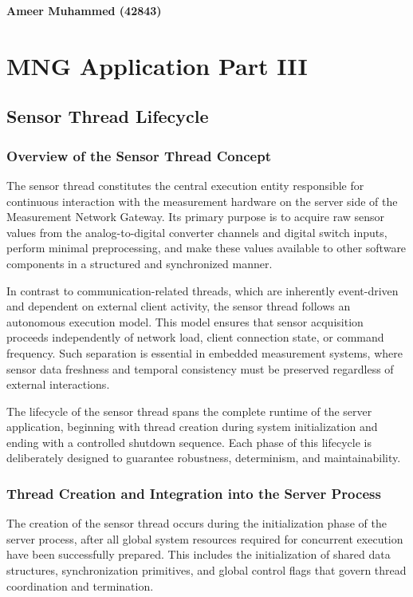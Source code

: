 \newpage
\null 
\vfill
\begin{center}
\textbf{\large Ameer Muhammed (42843)}
\end{center}
\vfill
{}
\clearpage	

\chapter{MNG Application Part III}
\section{Sensor Thread Lifecycle}
\subsection{Overview of the Sensor Thread Concept}
The sensor thread constitutes the central execution entity responsible for continuous interaction with the measurement hardware on the server side of the Measurement Network Gateway. Its primary purpose is to acquire raw sensor values from the analog-to-digital converter channels and digital switch inputs, perform minimal preprocessing, and make these values available to other software components in a structured and synchronized manner.

In contrast to communication-related threads, which are inherently event-driven and dependent on external client activity, the sensor thread follows an autonomous execution model. This model ensures that sensor acquisition proceeds independently of network load, client connection state, or command frequency. Such separation is essential in embedded measurement systems, where sensor data freshness and temporal consistency must be preserved regardless of external interactions.

The lifecycle of the sensor thread spans the complete runtime of the server application, beginning with thread creation during system initialization and ending with a controlled shutdown sequence. Each phase of this lifecycle is deliberately designed to guarantee robustness, determinism, and maintainability.


\subsection{Thread Creation and Integration into the Server Process}
The creation of the sensor thread occurs during the initialization phase of the server process, after all global system resources required for concurrent execution have been successfully prepared. This includes the initialization of shared data structures, synchronization primitives, and global control flags that govern thread coordination and termination.


